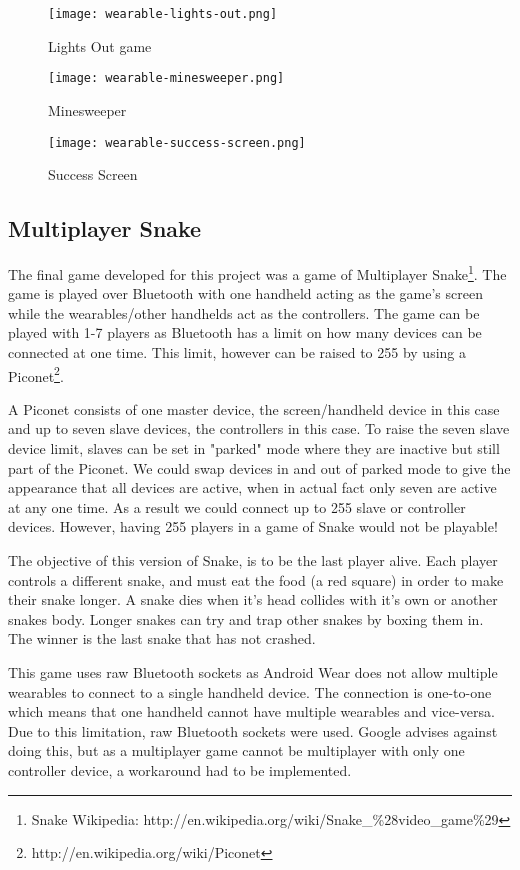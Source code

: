 \begin{figure}
    \centering
    \texttt{[image: wearable-lights-out.png]}
    \caption{Lights Out game}
    \label{fig:lights_out_game}
    \texttt{[image: wearable-minesweeper.png]}
    \caption{Minesweeper}
    \label{fig:minesweeper}
\end{figure}

\begin{figure}
    \centering
    \texttt{[image: wearable-success-screen.png]}
    \caption{Success Screen}
    \label{fig:success_screen}
\end{figure}


\clearpage
\subsection{Multiplayer Snake}

The final game developed for this project was a game of Multiplayer
Snake\footnote{Snake Wikipedia: http://en.wikipedia.org/wiki/Snake\_\%28video\_game\%29}.
The game is played over Bluetooth with one handheld acting as the game's screen
while the wearables/other handhelds act as the controllers. The game can be
played with 1-7 players as Bluetooth has a limit on how many devices can be
connected at one time. This limit, however can be raised to 255 by using a
Piconet\footnote{http://en.wikipedia.org/wiki/Piconet}.

A Piconet consists of one master device, the screen/handheld device in this case
and up to seven slave devices, the controllers in this case. To raise the seven
slave device limit, slaves can be set in "parked" mode where they are inactive
but still part of the Piconet. We could swap devices in and out of parked mode
to give the appearance that all devices are active, when in actual fact only
seven are active at any one time. As a result we could connect up to 255 slave
or controller devices. However, having 255 players in a game of Snake would not
be playable!

The objective of this version of Snake, is to be the last player alive. Each
player controls a different snake, and must eat the food (a red square) in order
to make their snake longer. A snake dies when it's head collides with it's own
or another snakes body. Longer snakes can try and trap other snakes by boxing
them in. The winner is the last snake that has not crashed.

This game uses raw Bluetooth sockets as Android Wear does not allow multiple
wearables to connect to a single handheld device. The connection is one-to-one
which means that one handheld cannot have multiple wearables and vice-versa.
Due to this limitation, raw Bluetooth sockets were used. Google advises against
doing this, but as a multiplayer game cannot be multiplayer with only one
controller device, a workaround had to be implemented.

